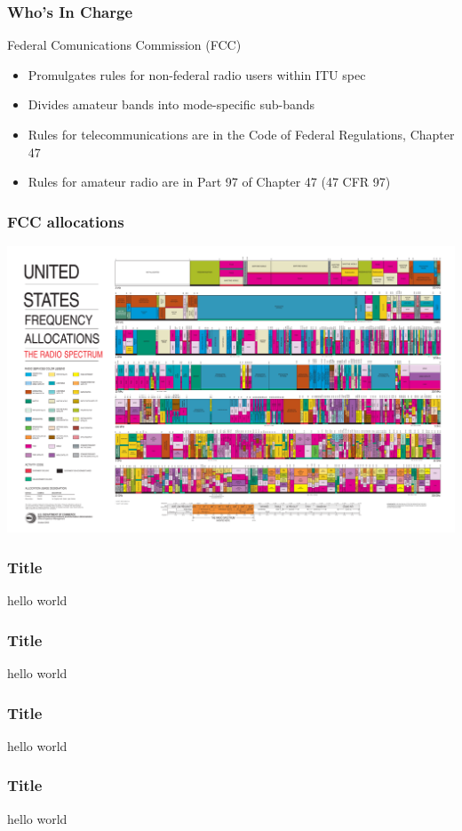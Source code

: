 \documentclass[12pt,letterpaper]{beamer}
\begin{document}
\begin{frame}
\frametitle{Who's In Charge}
Federal Comunications Commission (FCC)
\begin{itemize}
\item Promulgates  rules for non-federal radio users within ITU spec
\item Divides amateur bands into mode-specific sub-bands
\item Rules for telecommunications are in the Code of Federal Regulations, Chapter 47
\item Rules for amateur radio are in Part 97 of Chapter 47 (47 CFR 97)
\end{itemize}
\end{frame}

\begin{frame}
\frametitle{FCC allocations}
\begin{center}
\includegraphics[width=\textwidth]{2003-allochrt.pdf}
\end{center}
\end{frame}

\begin{frame}
\frametitle{Title}
hello world
\end{frame}

\begin{frame}
\frametitle{Title}
hello world
\end{frame}

\begin{frame}
\frametitle{Title}
hello world
\end{frame}

\begin{frame}
\frametitle{Title}
hello world
\end{frame}
\end{document}
